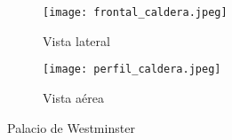 \documentclass{article}
\begin{document}
\begin{figure}[h!]
\centering
\begin{subfigure}[b]{0.45\linewidth}
\texttt{[image: frontal\_caldera.jpeg]}
\caption{Vista lateral}
\label{fig:westminster_lateral}
\end{subfigure}
\begin{subfigure}[b]{0.45\linewidth}
\texttt{[image: perfil\_caldera.jpeg]}
\caption{Vista aérea}
\label{fig:westminster_aerea}
\end{subfigure}
\caption{Palacio de Westminster}
\label{fig:westminster}
\end{figure}
\end{document}
